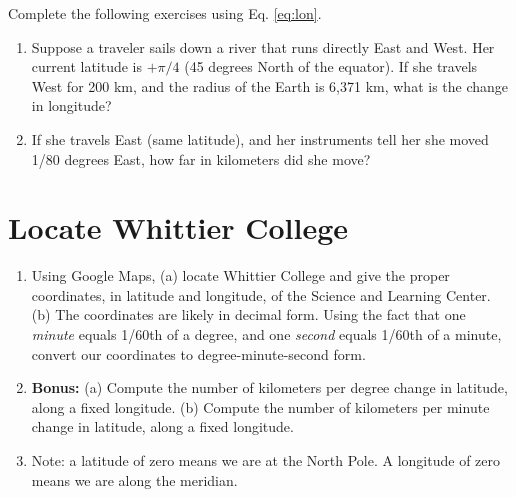 \documentclass[12pt]{article}
\begin{document}
Complete the following exercises using Eq. \ref{eq:lon}.

\begin{enumerate}
\item Suppose a traveler sails down a river that runs directly East and West.  Her current latitude is $+\pi/4$ (45 degrees North of the equator).  If she travels West for 200 km, and the radius of the Earth is 6,371 km, what is the change in longitude? \\ \vspace{2cm}
\item If she travels East (same latitude), and her instruments tell her she moved 1/80 degrees East, how far in kilometers did she move? \\ \vspace{2cm}
\end{enumerate}

\section{Locate Whittier College}
\label{sec:whit}

\begin{enumerate}
\item Using Google Maps, (a) locate Whittier College and give the proper coordinates, in latitude and longitude, of the Science and Learning Center. (b) The coordinates are likely in decimal form. Using the fact that one \textit{minute} equals 1/60th of a degree, and one \textit{second} equals 1/60th of a minute, convert our coordinates to degree-minute-second form.
\item \textbf{Bonus:} (a) Compute the number of kilometers per degree change in latitude, along a fixed longitude. (b) Compute the number of kilometers per minute change in latitude, along a fixed longitude.
\item Note: a latitude of zero means we are at the North Pole.  A longitude of zero means we are along the meridian.
\end{enumerate}
\end{document}
